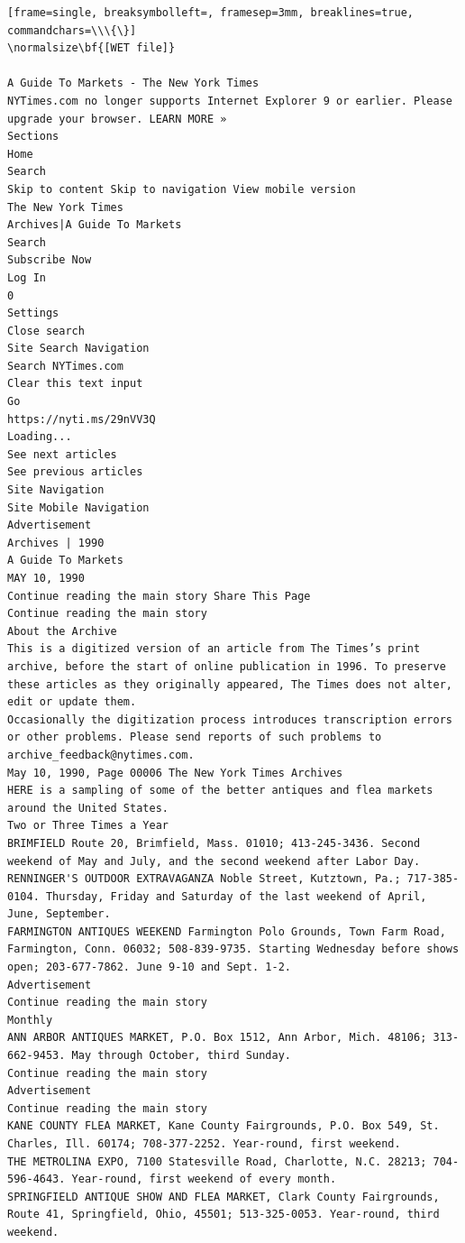 \documentclass{article}
\begin{document}
\begin{tiny}
\begin{Verbatim}[frame=single, breaksymbolleft=, framesep=3mm, breaklines=true, commandchars=\\\{\}]
\normalsize\bf{[WET file]}

A Guide To Markets - The New York Times
NYTimes.com no longer supports Internet Explorer 9 or earlier. Please upgrade your browser. LEARN MORE »
Sections
Home
Search
Skip to content Skip to navigation View mobile version
The New York Times
Archives|A Guide To Markets
Search
Subscribe Now
Log In
0
Settings
Close search
Site Search Navigation
Search NYTimes.com
Clear this text input
Go
https://nyti.ms/29nVV3Q
Loading...
See next articles
See previous articles
Site Navigation
Site Mobile Navigation
Advertisement
Archives | 1990
A Guide To Markets
MAY 10, 1990
Continue reading the main story Share This Page
Continue reading the main story
About the Archive
This is a digitized version of an article from The Times’s print archive, before the start of online publication in 1996. To preserve these articles as they originally appeared, The Times does not alter, edit or update them.
Occasionally the digitization process introduces transcription errors or other problems. Please send reports of such problems to archive_feedback@nytimes.com.
May 10, 1990, Page 00006 The New York Times Archives
HERE is a sampling of some of the better antiques and flea markets around the United States.
Two or Three Times a Year
BRIMFIELD Route 20, Brimfield, Mass. 01010; 413-245-3436. Second weekend of May and July, and the second weekend after Labor Day.
RENNINGER'S OUTDOOR EXTRAVAGANZA Noble Street, Kutztown, Pa.; 717-385-0104. Thursday, Friday and Saturday of the last weekend of April, June, September.
FARMINGTON ANTIQUES WEEKEND Farmington Polo Grounds, Town Farm Road, Farmington, Conn. 06032; 508-839-9735. Starting Wednesday before shows open; 203-677-7862. June 9-10 and Sept. 1-2.
Advertisement
Continue reading the main story
Monthly
ANN ARBOR ANTIQUES MARKET, P.O. Box 1512, Ann Arbor, Mich. 48106; 313-662-9453. May through October, third Sunday.
Continue reading the main story
Advertisement
Continue reading the main story
KANE COUNTY FLEA MARKET, Kane County Fairgrounds, P.O. Box 549, St. Charles, Ill. 60174; 708-377-2252. Year-round, first weekend.
THE METROLINA EXPO, 7100 Statesville Road, Charlotte, N.C. 28213; 704-596-4643. Year-round, first weekend of every month.
SPRINGFIELD ANTIQUE SHOW AND FLEA MARKET, Clark County Fairgrounds, Route 41, Springfield, Ohio, 45501; 513-325-0053. Year-round, third weekend.

\end{Verbatim}
\end{tiny}
\end{document}
